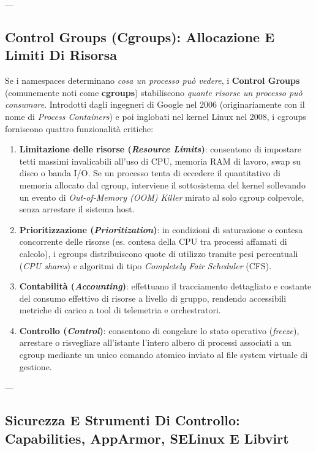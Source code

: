 \documentclass[11pt, a4paper]{article}
\begin{document}
---

\subsection{Control Groups (Cgroups): Allocazione E Limiti Di Risorsa}

Se i namespaces determinano \emph{cosa un processo può vedere}, i \textbf{Control Groups} (comunemente noti come \textbf{cgroups}) stabiliscono \emph{quante risorse un processo può consumare}. Introdotti dagli ingegneri di Google nel 2006 (originariamente con il nome di \emph{Process Containers}) e poi inglobati nel kernel Linux nel 2008, i cgroups forniscono quattro funzionalità critiche:
\begin{enumerate}
    \item \textbf{Limitazione delle risorse (\emph{Resource Limits})}: consentono di impostare tetti massimi invalicabili all'uso di CPU, memoria RAM di lavoro, swap su disco o banda I/O. Se un processo tenta di eccedere il quantitativo di memoria allocato dal cgroup, interviene il sottosistema del kernel sollevando un evento di \emph{Out-of-Memory (OOM) Killer} mirato al solo cgroup colpevole, senza arrestare il sistema host.
    \item \textbf{Prioritizzazione (\emph{Prioritization})}: in condizioni di saturazione o contesa concorrente delle risorse (es. contesa della CPU tra processi affamati di calcolo), i cgroups distribuiscono quote di utilizzo tramite pesi percentuali (\emph{CPU shares}) e algoritmi di tipo \emph{Completely Fair Scheduler} (CFS).
    \item \textbf{Contabilità (\emph{Accounting})}: effettuano il tracciamento dettagliato e costante del consumo effettivo di risorse a livello di gruppo, rendendo accessibili metriche di carico a tool di telemetria e orchestratori.
    \item \textbf{Controllo (\emph{Control})}: consentono di congelare lo stato operativo (\emph{freeze}), arrestare o risvegliare all'istante l'intero albero di processi associati a un cgroup mediante un unico comando atomico inviato al file system virtuale di gestione.
\end{enumerate}

---

\subsection{Sicurezza E Strumenti Di Controllo: Capabilities, AppArmor, SELinux E Libvirt}
\end{document}
